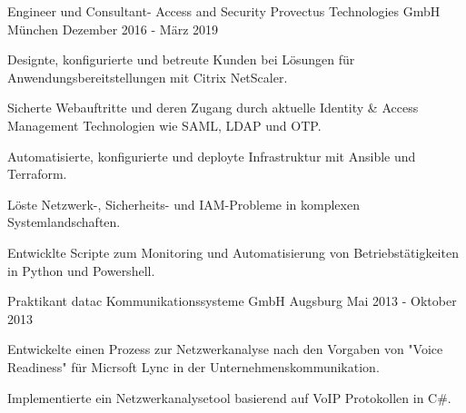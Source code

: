 


\begin{cventries}



\cventry
{Engineer und Consultant- Access and Security} %
{Provectus Technologies GmbH} %
{München} %
{Dezember 2016 - März 2019} %
{ %
\begin{cvitems}
\item {Designte, konfigurierte und betreute Kunden bei Lösungen für Anwendungsbereitstellungen mit Citrix NetScaler.}
\item {Sicherte Webauftritte und deren Zugang durch aktuelle Identity \& Access Management Technologien wie SAML, LDAP und OTP.}
\item {Automatisierte, konfigurierte und deployte Infrastruktur mit Ansible und Terraform. }
\item {Löste Netzwerk-, Sicherheits- und IAM-Probleme in komplexen Systemlandschaften.}
\item {Entwicklte Scripte zum Monitoring und Automatisierung von Betriebstätigkeiten in Python und Powershell.}
\end{cvitems}
}


\cventry
{Praktikant} %
{datac Kommunikationssysteme GmbH} %
{Augsburg} %
{Mai 2013 - Oktober 2013} %
{ %
\begin{cvitems}
\item {Entwickelte einen Prozess zur Netzwerkanalyse nach den Vorgaben von "Voice Readiness" für Micrsoft Lync in der Unternehmenskommunikation.}
\item {Implementierte ein Netzwerkanalysetool basierend auf VoIP Protokollen in C\#.}
\end{cvitems}
}


\end{cventries}
